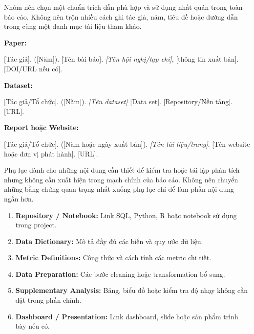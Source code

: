 \documentclass[12pt]{eDA_conquer2026}
\begin{document}
Nhóm nên chọn một chuẩn trích dẫn phù hợp và sử dụng nhất quán trong toàn báo cáo. Không nên trộn nhiều cách ghi tác giả, năm, tiêu đề hoặc đường dẫn trong cùng một danh mục tài liệu tham khảo.


\begin{aivncodebox}

\textbf{Paper:}

[Tác giả]. ([Năm]). [Tên bài báo]. \textit{[Tên hội nghị/tạp chí]}, [thông tin xuất bản]. [DOI/URL nếu có].

\textbf{Dataset:}

[Tác giả/Tổ chức]. ([Năm]). \textit{[Tên dataset]} [Data set]. [Repository/Nền tảng]. [URL].

\textbf{Report hoặc Website:}

[Tác giả/Tổ chức]. ([Năm hoặc ngày xuất bản]). \textit{[Tên tài liệu/trang]}. [Tên website hoặc đơn vị phát hành]. [URL].

\end{aivncodebox}


\label{section:references}
\vspace{-3.2em}
\printbibliography

\newpage
\begin{appendices}

Phụ lục dành cho những nội dung cần thiết để kiểm tra hoặc tái lập phân tích nhưng không cần xuất hiện trong mạch chính của báo cáo. Không nên chuyển những bằng chứng quan trọng nhất xuống phụ lục chỉ để làm phần nội dung ngắn hơn.

\begin{enumerate}
\item \textbf{Repository / Notebook:} Link SQL, Python, R hoặc notebook sử dụng trong project.
\item \textbf{Data Dictionary:} Mô tả đầy đủ các biến và quy ước dữ liệu.
\item \textbf{Metric Definitions:} Công thức và cách tính các metric chi tiết.
\item \textbf{Data Preparation:} Các bước cleaning hoặc transformation bổ sung.
\item \textbf{Supplementary Analysis:} Bảng, biểu đồ hoặc kiểm tra độ nhạy không cần đặt trong phần chính.
\item \textbf{Dashboard / Presentation:} Link dashboard, slide hoặc sản phẩm trình bày nếu có.
\end{enumerate}

\end{appendices}
\end{document}
